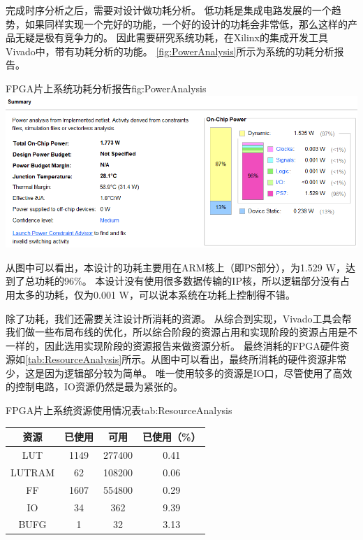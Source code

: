 \documentclass[supercite]{HustGraduPaper}
\begin{document}
完成时序分析之后，需要对设计做功耗分析。
低功耗是集成电路发展的一个趋势，如果同样实现一个完好的功能，一个好的设计的功耗会非常低，那么这样的产品无疑是极有竞争力的。
因此需要研究系统功耗，在Xilinx的集成开发工具Vivado中，带有功耗分析的功能。
\autoref{fig:PowerAnalysis}所示为系统的功耗分析报告。

\begin{generalfig}[htb]{FPGA片上系统功耗分析报告}{fig:PowerAnalysis}
	\includegraphics[width=\linewidth]{Figures/PowerAnalysis.png}
\end{generalfig}

从图中可以看出，本设计的功耗主要用在ARM核上（即PS部分），为1.529 W，达到了总功耗的96\%。
本设计没有使用很多数据传输的IP核，所以逻辑部分没有占用太多的功耗，仅为0.001 W，可以说本系统在功耗上控制得不错。

除了功耗，我们还需要关注设计所消耗的资源。
从综合到实现，Vivado工具会帮我们做一些布局布线的优化，所以综合阶段的资源占用和实现阶段的资源占用是不一样的，因此选用实现阶段的资源报告来做资源分析。
最终消耗的FPGA硬件资源如\autoref{tab:ResourceAnalysis}所示。从图中可以看出，最终所消耗的硬件资源非常少，这是因为逻辑部分较为简单。
唯一使用较多的资源是IO口，尽管使用了高效的控制电路，IO资源仍然是最为紧张的。

\begin{generaltab}{FPGA片上系统资源使用情况表}{tab:ResourceAnalysis}
	\begin{tabular}{cccc}
		\toprule
		资源     & 已使用       & 可用      & 已使用（\%）    \\ \midrule
		LUT      & 1149        & 277400    & 0.41           \\
		LUTRAM   & 62          & 108200    & 0.06           \\
		FF       & 1607        & 554800    & 0.29           \\
		IO       & 34          & 362       & 9.39           \\
		BUFG     & 1           & 32        & 3.13           \\
		\bottomrule
	\end{tabular}
\end{generaltab}
\end{document}
